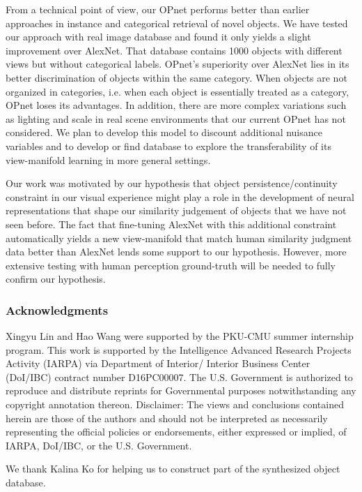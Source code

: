 \documentclass{article} %
\begin{document}
From a technical point of view, our OPnet performs better than earlier approaches \citep{li2015jointembedding} in instance and categorical retrieval of novel objects. We have tested our approach with real image database \citep{geusebroek2005amsterdam} and found it only yields a slight improvement over AlexNet. That database contains 1000 objects with different views but without categorical labels. OPnet's superiority over AlexNet lies in its better discrimination of objects within the same category. When objects are not organized in categories, i.e. when each object is essentially treated as a category, OPnet loses its advantages. In addition, there are more complex variations such as lighting and scale in real scene environments that our current OPnet has not considered. We plan to develop this model to discount additional nuisance variables and to develop or find database to explore the transferability of its view-manifold learning in more general settings.

Our work was motivated by our hypothesis that object persistence/continuity constraint in our visual experience might play a role in the development of neural representations that shape our similarity judgement of objects that we have not seen before. The fact that fine-tuning AlexNet with this additional constraint automatically yields a new view-manifold that match human similarity judgment data better than AlexNet lends some support to our hypothesis.  However, more extensive testing with human perception ground-truth will be needed to fully confirm our hypothesis. 

\subsubsection*{Acknowledgments}
Xingyu Lin and Hao Wang were supported by the PKU-CMU summer internship program. This work is supported by the Intelligence Advanced Research Projects Activity (IARPA) via Department of Interior/ Interior Business Center (DoI/IBC) contract number D16PC00007. The U.S. Government is authorized to reproduce and distribute reprints for Governmental purposes notwithstanding any copyright annotation thereon. Disclaimer: The views and conclusions contained herein are those of the authors and should not be interpreted as necessarily representing the official policies or endorsements, either expressed or implied, of IARPA, DoI/IBC, or the U.S. Government. 

We thank Kalina Ko for helping us to construct part of the synthesized object database. 
\end{document}

